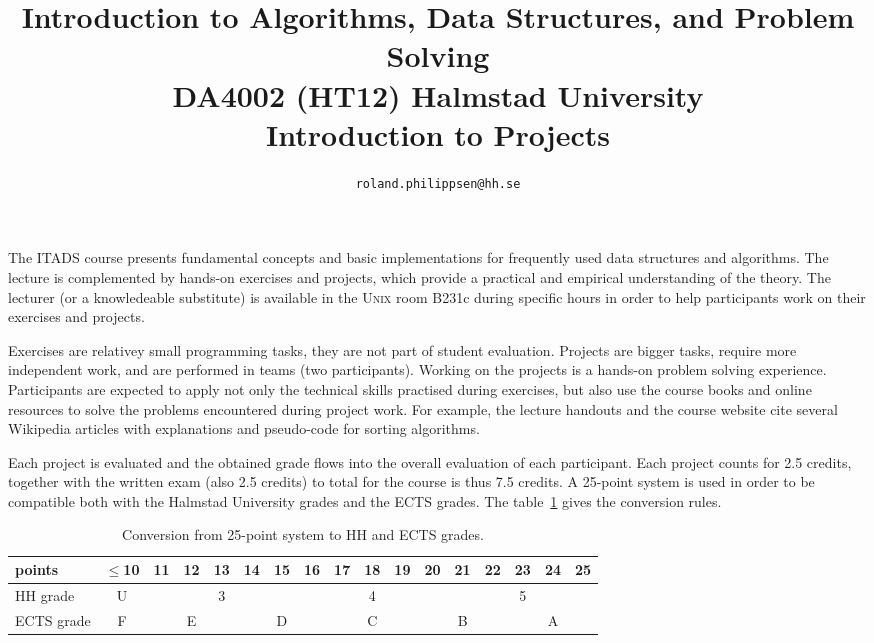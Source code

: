 \documentclass[a4paper,10pt]{article}
\begin{document}
\title{
  {\normalsize
    Introduction to Algorithms, Data Structures, and Problem Solving\\
    DA4002 (HT12) Halmstad University}\\
  Introduction to Projects
}
\author{
  \texttt{roland.philippsen@hh.se}
}
\maketitle

The ITADS course presents fundamental concepts and basic implementations for frequently used data structures and algorithms.
The lecture is complemented by hands-on exercises and projects, which provide a practical and empirical understanding of the theory.
The lecturer (or a knowledeable substitute) is available in the \textsc{Unix} room B231c during specific hours in order to help participants work on their exercises and projects.

Exercises are relativey small programming tasks, they are not part of student evaluation.
Projects are bigger tasks, require more independent work, and are performed in teams (two participants).
Working on the projects is a hands-on problem solving experience.
Participants are expected to apply not only the technical skills practised during exercises, but also use the course books and online resources to solve the problems encountered during project work.
For example, the lecture handouts and the course website cite several Wikipedia articles with explanations and pseudo-code for sorting algorithms.

Each project is evaluated and the obtained grade flows into the overall evaluation of each participant.
Each project counts for 2.5 credits, together with the written exam (also 2.5 credits) to total for the course is thus 7.5 credits.
A 25-point system is used in order to be compatible both with the Halmstad University grades and the ECTS grades.
The table~\ref{tab:grades} gives the conversion rules.

\begin{table}
  \centering
  \small
  \noindent
  \begin{tabular}{|l|c|c|c|c|c|c|c|c|c|c|c|c|c|c|c|c|}
    \hline
    points & $\leq$10 & 11 & 12 & 13 & 14 & 15 & 16 & 17 & 18 & 19 & 20 & 21 & 22 & 23 & 24 & 25 \\
    \hline
    HH grade & U & \multicolumn{5}{|c|}{3} & \multicolumn{5}{|c|}{4} & \multicolumn{5}{|c|}{5} \\
    \hline
    ECTS grade & F & \multicolumn{3}{|c|}{E} & \multicolumn{3}{|c|}{D} & \multicolumn{3}{|c|}{C} & \multicolumn{3}{|c|}{B} & \multicolumn{3}{|c|}{A} \\
    \hline
  \end{tabular}
  \caption{
    Conversion from 25-point system to HH and ECTS grades.
  }\label{tab:grades}
\end{table}
\end{document}
